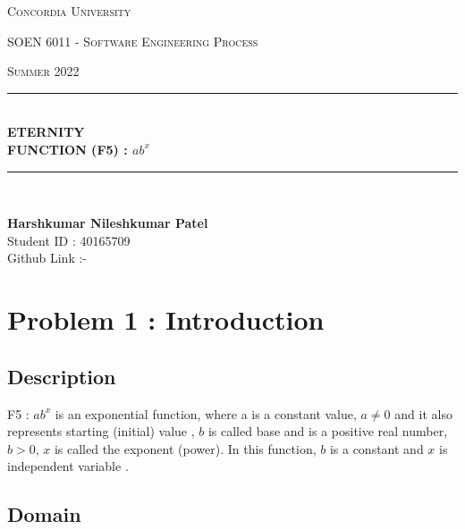 \documentclass[12pt, a4paper]{article}
\begin{document}
\begin{titlepage}
	\centering
    \vspace*{0.5 cm}
\begin{center}    \textsc{\Large Concordia University}\\[2.0 cm]	\end{center}
	\textsc{\Large  SOEN 6011 - Software Engineering Process }\\[0.5 cm]
	\begin{center} \textsc{\Large Summer 2022} \end{center}

	\vspace{15mm}
	\rule{\linewidth}{0.2 mm} \\[0.4 cm]
	{ \huge \textbf {ETERNITY}}\\[0.2 cm]
	{ \large \textbf{FUNCTION (F5) : $ab^x$}}
	\rule{\linewidth}{0.2 mm} \\[1.5 cm]
\vspace{70mm}	
\begin{center}   
                 {\large \textbf{Harshkumar Nileshkumar Patel}  }\\[0.2 cm]
                 {\large Student ID : 40165709 }\\[0.2 cm]
                 \vspace{10mm}
                 {\large Github Link :-  }
\end{center}
	
\end{titlepage}
\tableofcontents
\newpage

\section{Problem 1 : Introduction}
\subsection{Description}

F5 : $ab^x$ is an exponential function, where a is a constant value, $a \ne 0$ and it also represents starting (initial) value , $b$ is called base and is a positive real number, $b > 0$, $x$ is called the exponent (power). In this function, $b$ is a constant and $x$ is  independent variable \cite{Exponential Growth and Decay}.

\subsection{Domain}
\end{document}
